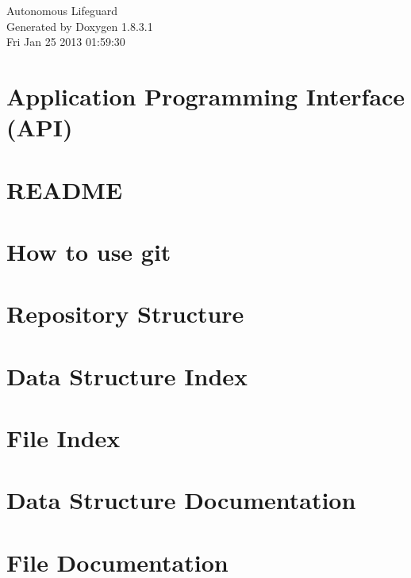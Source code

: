 \documentclass{book}
\begin{document}
\hypersetup{pageanchor=false,citecolor=blue}
\begin{titlepage}
\vspace*{7cm}
\begin{center}
{\Large Autonomous Lifeguard }\\
\vspace*{1cm}
{\large Generated by Doxygen 1.8.3.1}\\
\vspace*{0.5cm}
{\small Fri Jan 25 2013 01:59:30}\\
\end{center}
\end{titlepage}
\clearemptydoublepage
{}
\tableofcontents
\clearemptydoublepage
{}
\hypersetup{pageanchor=true,citecolor=blue}
\chapter{Application Programming Interface (A\-P\-I)}
\label{index}\hypertarget{index}{}
\chapter{R\-E\-A\-D\-M\-E}
\label{md_README}
\hypertarget{md_README}{}

\chapter{How to use git}
\label{md_github}
\hypertarget{md_github}{}

\chapter{Repository Structure}
\label{md_structure}
\hypertarget{md_structure}{}

\chapter{Data Structure Index}

\chapter{File Index}

\chapter{Data Structure Documentation}

\chapter{File Documentation}












\printindex
\end{document}
